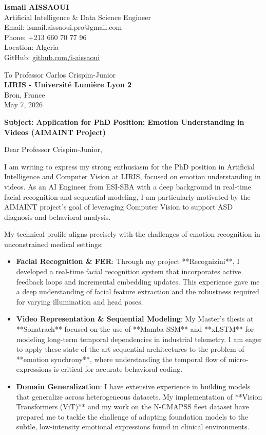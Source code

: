 \documentclass[11pt,a4paper]{article}
\begin{document}
\noindent \textbf{Ismail AISSAOUI} \\
Artificial Intelligence \& Data Science Engineer \\
Email: ismail.aissaoui.pro@gmail.com \\
Phone: +213 660 70 77 96 \\
Location: Algeria \\
GitHub: \href{https://github.com/i-aissaoui}{github.com/i-aissaoui}

\bigskip

\begin{flushright}
    To Professor Carlos Crispim-Junior \\
    \textbf{LIRIS - Université Lumière Lyon 2} \\
    Bron, France \\
    \medskip
    May 7, 2026
\end{flushright}

\bigskip

\noindent \textbf{Subject: Application for PhD Position: Emotion Understanding in Videos (AIMAINT Project)}

\bigskip

\noindent Dear Professor Crispim-Junior,

\medskip

I am writing to express my strong enthusiasm for the PhD position in Artificial Intelligence and Computer Vision at LIRIS, focused on emotion understanding in videos. As an AI Engineer from ESI-SBA with a deep background in real-time facial recognition and sequential modeling, I am particularly motivated by the AIMAINT project’s goal of leveraging Computer Vision to support ASD diagnosis and behavioral analysis.

My technical profile aligns precisely with the challenges of emotion recognition in unconstrained medical settings:
\begin{itemize}
    \item \textbf{Facial Recognition \& FER}: Through my project **Recognizini**, I developed a real-time facial recognition system that incorporates active feedback loops and incremental embedding updates. This experience gave me a deep understanding of facial feature extraction and the robustness required for varying illumination and head poses.
    \item \textbf{Video Representation \& Sequential Modeling}: My Master's thesis at **Sonatrach** focused on the use of **Mamba-SSM** and **xLSTM** for modeling long-term temporal dependencies in industrial telemetry. I am eager to apply these state-of-the-art sequential architectures to the problem of **emotion synchrony**, where understanding the temporal flow of micro-expressions is critical for accurate behavioral coding.
    \item \textbf{Domain Generalization}: I have extensive experience in building models that generalize across heterogeneous datasets. My implementation of **Vision Transformers (ViT)** and my work on the N-CMAPSS fleet dataset have prepared me to tackle the challenge of adapting foundation models to the subtle, low-intensity emotional expressions found in clinical environments.
\end{itemize}
\end{document}
